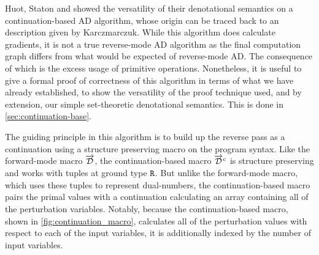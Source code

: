   Huot, Staton and \Vakar{} showed the versatility of their denotational semantics on a continuation-based AD algorithm, whose origin can be traced back to an description given by Karczmarczuk\cite{KarczmarczukLazyTimeReversal}.
  While this algorithm does calculate gradients, it is not a true reverse-mode AD algorithm as the final computation graph differs from what would be expected of reverse-mode AD\cite{PearlmutterSiskind2008}.
  The consequence of which is the excess usage of primitive operations.
  Nonetheless, it is useful to give a formal proof of correctness of this algorithm in terms of what we have already established, to show the versatility of the proof technique used, and by extension, our simple set-theoretic denotational semantics.
  This is done in \cref{sec:continuation-base}.

  The guiding principle in this algorithm is to build up the reverse pass as a continuation using a structure preserving macro on the program syntax.
  Like the forward-mode macro $\overrightarrow{\mathcal{D}}$, the continuation-based macro $\overrightarrow{\mathcal{D}}^c$ is structure preserving and works with tuples at ground type $\texttt{R}$.
  But unlike the forward-mode macro, which uses these tuples to represent dual-numbers, the continuation-based macro pairs the primal values with a continuation calculating an array containing all of the perturbation variables.
  Notably, because the continuation-based macro, shown in \cref{fig:continuation_macro}, calculates all of the perturbation values with respect to each of the input variables, it is additionally indexed by the number of input variables.

